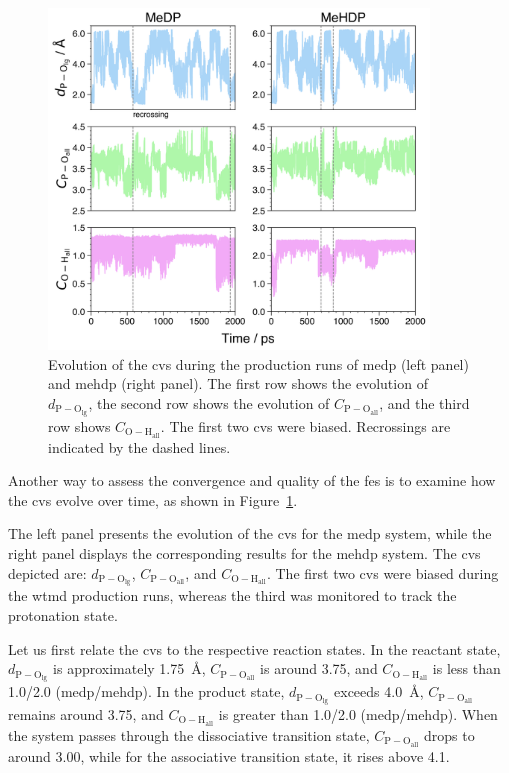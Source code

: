 \begin{figure}[b!]
    \centering
    \includegraphics[width=0.9\textwidth]{Figures/4_Results/results_300K_cv_evolution.png}
    \caption{Evolution of the \acp{cv} during the production runs of \ac{medp} (left panel) and \ac{mehdp} (right panel). The first row shows the evolution of $d_\mathrm{P-O_{\mathrm{lg}}}$, the second row shows the evolution of $C_\mathrm{P-O_{\mathrm{all}}}$, and the third row shows $C_\mathrm{O-H_{\mathrm{all}}}$. The first two \acp{cv} were biased. Recrossings are indicated by the dashed lines.}
    \label{fig:300k_cv_evolution}
\end{figure}

Another way to assess the convergence and quality of the \ac{fes} is to examine how the \acp{cv} evolve over time, as shown in Figure~\ref{fig:300k_cv_evolution}.

The left panel presents the evolution of the \acp{cv} for the \ac{medp} system, while the right panel displays the corresponding results for the \ac{mehdp} system. The \acp{cv} depicted are: $d_\mathrm{P-O_{\mathrm{lg}}}$, $C_\mathrm{P-O_{\mathrm{all}}}$, and $C_\mathrm{O-H_{\mathrm{all}}}$. The first two \acp{cv} were biased during the \ac{wtmd} production runs, whereas the third was monitored to track the protonation state.

Let us first relate the \acp{cv} to the respective reaction states. In the reactant state, $d_\mathrm{P-O_{\mathrm{lg}}}$ is approximately 1.75~\AA, $C_\mathrm{P-O_{\mathrm{all}}}$ is around 3.75, and $C_\mathrm{O-H_{\mathrm{all}}}$ is less than 1.0/2.0 (\ac{medp}/\ac{mehdp}). In the product state, $d_\mathrm{P-O_{\mathrm{lg}}}$ exceeds 4.0~\AA, $C_\mathrm{P-O_{\mathrm{all}}}$ remains around 3.75, and $C_\mathrm{O-H_{\mathrm{all}}}$ is greater than 1.0/2.0 (\ac{medp}/\ac{mehdp}). When the system passes through the dissociative transition state, $C_\mathrm{P-O_{\mathrm{all}}}$ drops to around 3.00, while for the associative transition state, it rises above 4.1.

